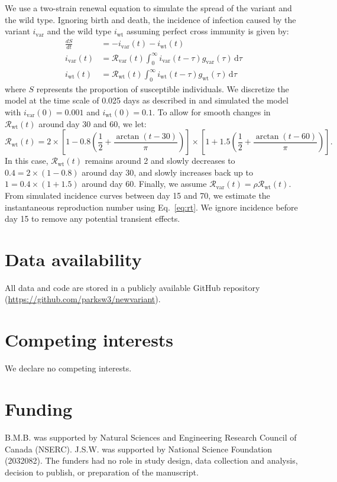 \documentclass[12pt]{article}
\newcommand{\eref}[1]{Eq.~\ref{eq:#1}}
\newcommand{\vvvar}{\mathrm{var}}
\newcommand{\wwwt}{\mathrm{wt}}
\newcommand{\Rx}[1]{\ensuremath{{\mathcal R}_{#1}}\xspace}
\newcommand{\Rw}{\Rx{\wwwt}}
\newcommand{\Rv}{\Rx{\vvvar}}
\newcommand{\dd}[1]{\ensuremath{\, \mathrm{d}#1}}
\newcommand{\dtau}{\dd{\tau}}
\newcommand{\ix}[1]{\ensuremath{{i}_{#1}}\xspace}
\newcommand{\iw}{\ix{\wwwt}}
\newcommand{\iv}{\ix{\vvvar}}
\begin{document}
We use a two-strain renewal equation to simulate the spread of the variant and the wild type.
Ignoring birth and death, the incidence of infection caused by the variant $\iv$ and the wild type $\iw$ assuming perfect cross immunity is given by:
\begin{align}
\frac{dS}{dt} &= - \iv(t) - \iw(t)\\
\iv(t) &= \Rv(t) \int_{0}^\infty \iv(t-\tau) g_{\mathrm{var}}(\tau) \dtau\\
\iw(t) &= \Rw(t) \int_{0}^\infty \iw(t-\tau) g_{\mathrm{wt}}(\tau) \dtau
\end{align}
where $S$ represents the proportion of susceptible individuals.
We discretize the model at the time scale of 0.025 days as described in \cite{park2021forward} and simulated the model with $\iv(0) = 0.001$ and $\iw(0) = 0.1$.
To allow for smooth changes in $\Rw(t)$ around day 30 and 60, we let:
\begin{equation}
\Rw(t) = 2 \times \left[1 - 0.8 \left(\frac{1}{2} + \frac{\arctan(t-30)}{\pi} \right) \right] \times \left[1 + 1.5 \left(\frac{1}{2} + \frac{\arctan(t-60)}{\pi} \right) \right].
\end{equation}
In this case, $\Rw(t)$ remains around 2 and slowly decreases to $0.4 = 2 \times (1-0.8)$ around day 30, and slowly increases back up to $1 = 0.4 \times (1 + 1.5)$ around day 60.
Finally, we assume $\Rv(t) = \rho \Rw(t)$.
From simulated incidence curves between day 15 and 70, we estimate the instantaneous reproduction number using \eref{rt}.
We ignore incidence before day 15 to remove any potential transient effects.

\section*{Data availability}

All data and code are stored in a publicly available GitHub repository (\url{https://github.com/parksw3/newvariant}).

\section*{Competing interests}

We declare no competing interests.

\section*{Funding}

B.M.B. was supported by Natural Sciences and Engineering Research Council of Canada (NSERC). 
J.S.W. was supported by National Science Foundation (2032082).
The funders had no role in study design, data collection and analysis, decision to publish, or preparation of the manuscript.
\end{document}

